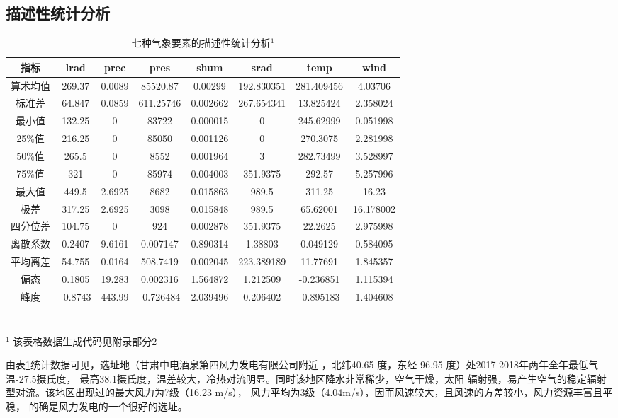 \documentclass[AutoFakeBold]{LZUThesis}
\begin{document}
\subsection{描述性统计分析}

\begin{table}[H]
    \centering
    \caption{七种气象要素的描述性统计分析$^1$}
    \begin{tabular}{cccccccc}
    \toprule
    指标 & lrad & prec & pres & shum & srad & temp & wind \\
    \midrule
    算术均值 & 269.37 & 0.0089 & 85520.87 & 0.00299 & 192.830351 & 281.409456 & 4.03706 \\
    标准差 & 64.847 & 0.0859 & 611.25746 & 0.002662 & 267.654341 & 13.825424 & 2.358024 \\
    最小值 & 132.25 & 0 & 83722 & 0.000015 & 0 & 245.62999 & 0.051998 \\
    25\%值 & 216.25 & 0 & 85050 & 0.001126 & 0 & 270.3075 & 2.281998 \\
    50\%值 & 265.5 & 0 & 8552 & 0.001964 & 3 & 282.73499 & 3.528997 \\
    75\%值 & 321 & 0 & 85974 & 0.004003 & 351.9375 & 292.57 & 5.257996 \\
    最大值 & 449.5 & 2.6925 & 8682 & 0.015863 & 989.5 & 311.25 & 16.23 \\
    极差 & 317.25 & 2.6925 & 3098 & 0.015848 & 989.5 & 65.62001 & 16.178002 \\
    四分位差 & 104.75 & 0 & 924 & 0.002878 & 351.9375 & 22.2625 & 2.975998 \\
    离散系数 & 0.2407 & 9.6161 & 0.007147 & 0.890314 & 1.38803 & 0.049129 & 0.584095 \\
    平均离差 & 54.755 & 0.0164 & 508.7419 & 0.002045 & 223.389189 & 11.77691 & 1.845357 \\
    偏态 & 0.1805 & 19.283 & 0.002316 & 1.564872 & 1.212509 & -0.236851 & 1.115394 \\
    峰度 & -0.8743 & 443.99 & -0.726484 & 2.039496 & 0.206402 & -0.895183 & 1.404608 \\
    \bottomrule \\
    \end{tabular} \\
    \footnotesize{$^1$ 该表格数据生成代码见附录部分2} \\
    \label{analysis}
\end{table}

由表\ref{analysis}统计数据可见，选址地（甘肃中电酒泉第四风力发电有限公司附近
，北纬40.65 度，东经 96.95 度）处2017-2018年两年全年最低气温-27.5摄氏度，
最高38.1摄氏度，温差较大，冷热对流明显。同时该地区降水非常稀少，空气干燥，太阳
辐射强，易产生空气的稳定辐射型对流。该地区出现过的最大风力为7级（16.23 m/s），
风力平均为3级（4.04m/s），因而风速较大，且风速的方差较小，风力资源丰富且平稳，
的确是风力发电的一个很好的选址。
\end{document}
